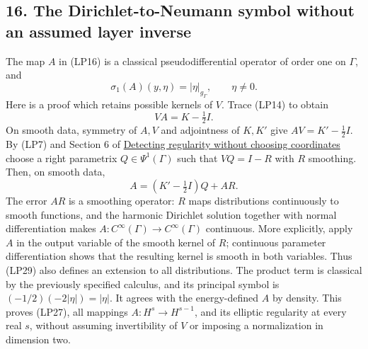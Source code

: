 \documentclass[
  11pt,
]{article}
\makeatletter
\let\ReaderOriginalAnchorStart\hyper@anchorstart
\let\ReaderOriginalAnchorEnd\hyper@anchorend
\let\ReaderPendingAliases\@empty
\def\ReaderArmAliases#1{\gdef\ReaderPendingAliases{#1}}
\def\hyper@anchorstart#1{\ReaderIfNativeAnchorTF{#1}{\ReaderPendingAliases\global\let\ReaderPendingAliases\@empty}{}\ReaderOriginalAnchorStart{#1}}
\makeatother
\begin{document}
\ReaderArmAliases{\ReaderOriginalAnchorStart{AN03-SBD-016}\ReaderOriginalAnchorEnd\begingroup\expandafter\def\csname @currentHref\endcsname{AN03-SBD-016}\label{AN03-SBD-016}\endgroup\ReaderOriginalAnchorStart{an03-sbd-016-the-dirichlet-to-neumann-symbol-without-an-assumed-layer-inverse}\ReaderOriginalAnchorEnd\begingroup\expandafter\def\csname @currentHref\endcsname{an03-sbd-016-the-dirichlet-to-neumann-symbol-without-an-assumed-layer-inverse}\label{an03-sbd-016-the-dirichlet-to-neumann-symbol-without-an-assumed-layer-inverse}\endgroup\ReaderOriginalAnchorStart{16-the-dirichlet-to-neumann-symbol-without-an-assumed-layer-inverse}\ReaderOriginalAnchorEnd\begingroup\expandafter\def\csname @currentHref\endcsname{16-the-dirichlet-to-neumann-symbol-without-an-assumed-layer-inverse}\label{16-the-dirichlet-to-neumann-symbol-without-an-assumed-layer-inverse}\endgroup\ReaderOriginalAnchorStart{the-dirichlet-to-neumann-symbol-without-an-assumed-layer-inverse}\ReaderOriginalAnchorEnd}
\subsection{16. The Dirichlet-to-Neumann symbol without an assumed layer
inverse}\label{the-dirichlet-to-neumann-symbol-without-an-assumed-layer-inverse}

The map \(A\) in (LP16) is a classical pseudodifferential operator of
order one on \(\Gamma\), and \[
 \sigma_1(A)(y,\eta)=|\eta|_{g_\Gamma},\qquad\eta\ne0.
 \tag{LP27}
\] Here is a proof which retains possible kernels of \(V\). Trace (LP14)
to obtain \[
 VA=K-\tfrac12 I.
 \tag{LP28}
\] On smooth data, symmetry of \(A,V\) and adjointness of \(K,K'\) give
\(AV=K'-\tfrac12 I\). By (LP7) and Section 6 of
\href{geometric-microlocal-calculus.pdf}{Detecting regularity without
choosing coordinates} choose a right parametrix \(Q\in\Psi^1(\Gamma)\)
such that \(VQ=I-R\) with \(R\) smoothing. Then, on smooth data, \[
 A=(K'-\tfrac12 I)Q+AR.
 \tag{LP29}
\] The error \(AR\) is a smoothing operator: \(R\) maps distributions
continuously to smooth functions, and the harmonic Dirichlet solution
together with normal differentiation makes
\(A:C^\infty(\Gamma)\to C^\infty(\Gamma)\) continuous. More explicitly,
apply \(A\) in the output variable of the smooth kernel of \(R\);
continuous parameter differentiation shows that the resulting kernel is
smooth in both variables. Thus (LP29) also defines an extension to all
distributions. The product term is classical by the previously specified
calculus, and its principal symbol is \((-1/2)(-2|\eta|)=|\eta|\). It
agrees with the energy-defined \(A\) by density. This proves (LP27), all
mappings \(A:H^s\to H^{s-1}\), and its elliptic regularity at every real
\(s\), without assuming invertibility of \(V\) or imposing a
normalization in dimension two.
\end{document}
